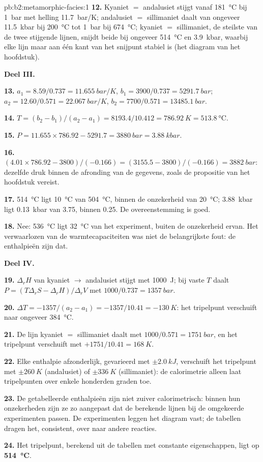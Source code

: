 \begin{solution}{pb:b2:metamorphic-facies:1}
\textbf{12.} Kyaniet $=$ andalusiet stijgt vanaf \qty{181}{\celsius} bij \qty{1}{bar} met
helling \qty{11.7}{bar/K}; andalusiet $=$ sillimaniet daalt van ongeveer \qty{11.5}{kbar} bij
\qty{200}{\celsius} tot \qty{1}{bar} bij \qty{674}{\celsius}; kyaniet $=$ sillimaniet, de
steilste van de twee stijgende lijnen, snijdt beide bij ongeveer \qty{514}{\celsius} en \qty{3.9}{kbar}, waarbij elke lijn maar aan
één kant van het snijpunt stabiel is (het diagram van het hoofdstuk).

\noindent\textbf{Deel III.}

\textbf{13.} $a_1 = 8.59/0.737 = \qty{11.655}{bar/K}$, $b_1 = 3900/0.737 =
\qty{5291.7}{bar}$; $a_2 = 12.60/0.571 = \qty{22.067}{bar/K}$, $b_2 = 7700/0.571 =
\qty{13485.1}{bar}$.

\textbf{14.} $T = (b_2 - b_1)/(a_2 - a_1) = 8193.4/10.412 = \qty{786.92}{K} =
\qty{513.8}{\celsius}$.

\textbf{15.} $P = 11.655\times786.92 - 5291.7 = \qty{3880}{bar} = \qty{3.88}{kbar}$.

\textbf{16.} $(4.01\times786.92 - 3800)/(-0.166) = (3155.5 - 3800)/(-0.166) =
\qty{3882}{bar}$: dezelfde druk binnen de afronding van de gegevens, zoals de propositie van het hoofdstuk vereist.

\textbf{17.} \qty{514}{\celsius} ligt \qty{10}{\celsius} van \qty{504}{\celsius}, binnen
de onzekerheid van \qty{20}{\celsius}; \qty{3.88}{kbar} ligt \qty{0.13}{kbar} van 3.75,
binnen 0.25. De overeenstemming is goed.

\textbf{18.} Nee: \qty{536}{\celsius} ligt \qty{32}{\celsius} van het experiment, buiten de
onzekerheid ervan. Het verwaarlozen van de warmtecapaciteiten was niet de belangrijkste fout: de enthalpieën zijn dat.

\noindent\textbf{Deel IV.}

\textbf{19.} $\Delta_r H$ van kyaniet $\to$ andalusiet stijgt met \qty{1000}{J}; bij vaste
$T$ daalt $P = (T\Delta_r S - \Delta_r H)/\Delta_r V$ met $1000/0.737 = \qty{1357}{bar}$.

\textbf{20.} $\Delta T = -1357/(a_2 - a_1) = -1357/10.41 = \qty{-130}{K}$: het tripelpunt
verschuift naar ongeveer \qty{384}{\celsius}.

\textbf{21.} De lijn kyaniet $=$ sillimaniet daalt met $1000/0.571 = \qty{1751}{bar}$, en
het tripelpunt verschuift met $+1751/10.41 = \qty{+168}{K}$.

\textbf{22.} Elke enthalpie afzonderlijk, gevarieerd met $\pm\qty{2.0}{kJ}$, verschuift het tripelpunt met
$\pm\qty{260}{K}$ (andalusiet) of $\pm\qty{336}{K}$ (sillimaniet): de calorimetrie alleen laat
tripelpunten over enkele honderden graden toe.

\textbf{23.} De getabelleerde enthalpieën zijn niet zuiver calorimetrisch: binnen hun
onzekerheden zijn ze zo aangepast dat de berekende lijnen bij de omgekeerde experimenten passen.
De experimenten leggen het diagram vast; de tabellen dragen het, consistent, over naar andere reacties.

\textbf{24.} Het tripelpunt, berekend uit de tabellen met constante eigenschappen, ligt op
\textbf{\qty[text-series-to-math=true]{514}{\celsius}}.
\end{solution}
